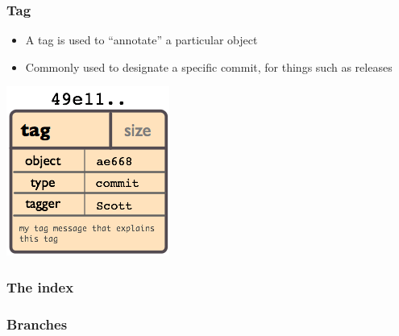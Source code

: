 \documentclass{beamer}
\begin{document}
\begin{frame}
  \frametitle{Tag}
  \begin{itemize}
    \item A tag is used to ``annotate'' a particular object
    \item Commonly used to designate a specific commit, for things such as releases
  \end{itemize}
  \includegraphics[scale = .7]{images/object-tag.png}
\end{frame}


\begin{frame}
  \frametitle{The index}
\end{frame}

\begin{frame}
  \frametitle{Branches}
\end{frame}
\end{document}
